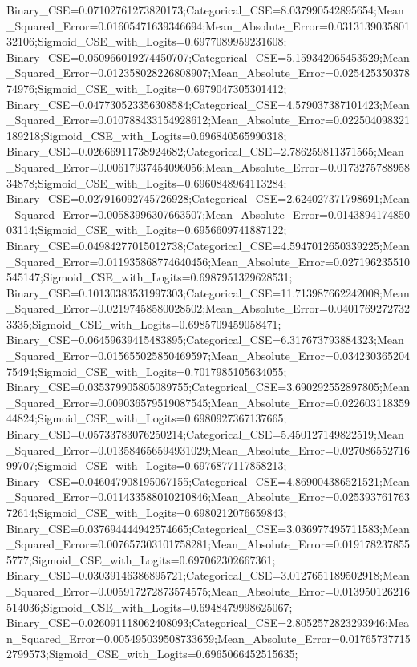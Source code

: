 Binary_CSE=0.07102761273820173;Categorical_CSE=8.037990542895654;Mean_Squared_Error=0.01605471639346694;Mean_Absolute_Error=0.031313903580132106;Sigmoid_CSE_with_Logits=0.6977089959231608;
Binary_CSE=0.050966019274450707;Categorical_CSE=5.159342065453529;Mean_Squared_Error=0.012358028226808907;Mean_Absolute_Error=0.02542535037874976;Sigmoid_CSE_with_Logits=0.6979047305301412;
Binary_CSE=0.047730523356308584;Categorical_CSE=4.579037387101423;Mean_Squared_Error=0.010788433154928612;Mean_Absolute_Error=0.022504098321189218;Sigmoid_CSE_with_Logits=0.696840565990318;
Binary_CSE=0.02666911738924682;Categorical_CSE=2.786259811371565;Mean_Squared_Error=0.00617937454096056;Mean_Absolute_Error=0.017327578895834878;Sigmoid_CSE_with_Logits=0.6960848964113284;
Binary_CSE=0.027916092745726928;Categorical_CSE=2.624027371798691;Mean_Squared_Error=0.00583996307663507;Mean_Absolute_Error=0.014389417485003114;Sigmoid_CSE_with_Logits=0.6956609741887122;
Binary_CSE=0.04984277015012738;Categorical_CSE=4.5947012650339225;Mean_Squared_Error=0.011935868774640456;Mean_Absolute_Error=0.027196235510545147;Sigmoid_CSE_with_Logits=0.6987951329628531;
Binary_CSE=0.10130383531997303;Categorical_CSE=11.713987662242008;Mean_Squared_Error=0.02197458580028502;Mean_Absolute_Error=0.04017692727323335;Sigmoid_CSE_with_Logits=0.6985709459058471;
Binary_CSE=0.06459639415483895;Categorical_CSE=6.317673793884323;Mean_Squared_Error=0.015655025850469597;Mean_Absolute_Error=0.03423036520475494;Sigmoid_CSE_with_Logits=0.7017985105634055;
Binary_CSE=0.035379905805089755;Categorical_CSE=3.690292552897805;Mean_Squared_Error=0.009036579519087545;Mean_Absolute_Error=0.02260311835944824;Sigmoid_CSE_with_Logits=0.6980927367137665;
Binary_CSE=0.05733783076250214;Categorical_CSE=5.450127149822519;Mean_Squared_Error=0.013584656594931029;Mean_Absolute_Error=0.02708655271699707;Sigmoid_CSE_with_Logits=0.6976877117858213;
Binary_CSE=0.046047908195067155;Categorical_CSE=4.869004386521521;Mean_Squared_Error=0.011433588010210846;Mean_Absolute_Error=0.02539376176372614;Sigmoid_CSE_with_Logits=0.6980212076659843;
Binary_CSE=0.037694444942574665;Categorical_CSE=3.036977495711583;Mean_Squared_Error=0.007657303101758281;Mean_Absolute_Error=0.0191782378555777;Sigmoid_CSE_with_Logits=0.697062302667361;
Binary_CSE=0.03039146386895721;Categorical_CSE=3.0127651189502918;Mean_Squared_Error=0.005917272873574575;Mean_Absolute_Error=0.013950126216514036;Sigmoid_CSE_with_Logits=0.6948479998625067;
Binary_CSE=0.026091118062408093;Categorical_CSE=2.8052572823293946;Mean_Squared_Error=0.005495039508733659;Mean_Absolute_Error=0.017657377152799573;Sigmoid_CSE_with_Logits=0.6965066452515635;
